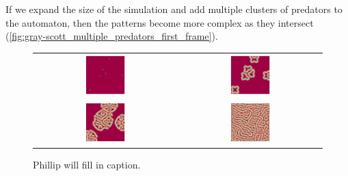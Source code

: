 If we expand the size of the simulation and add multiple clusters of predators to the automaton, then the patterns become more complex as they intersect (\autoref{fig:gray-scott_multiple_predators_first_frame}).\\


\begin{figure}[h]
\centering
\mySfFamily
\begin{tabular}{c c}
\includegraphics[width = 0.3\textwidth]{../images/f038_100_multi_Moment_1.jpg} & \includegraphics[width = 0.3\textwidth]{../images/f038_100_multi_Moment_2.jpg} \\[2ex]
\includegraphics[width = 0.3\textwidth]{../images/f038_100_multi_Moment_3.jpg} & \includegraphics[width = 0.3\textwidth]{../images/f038_100_multi_Moment_4.jpg}
\end{tabular}
\caption{Phillip will fill in caption.}
\label{fig:gray-scott_multiple_predators_first_frame}
\end{figure}

